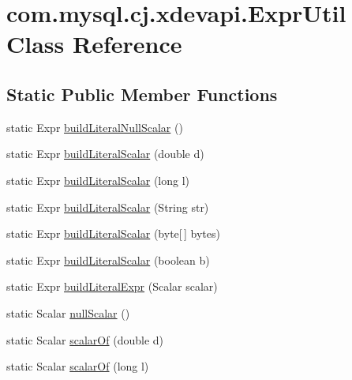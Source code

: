 \hypertarget{classcom_1_1mysql_1_1cj_1_1xdevapi_1_1_expr_util}{}\section{com.\+mysql.\+cj.\+xdevapi.\+Expr\+Util Class Reference}
\label{classcom_1_1mysql_1_1cj_1_1xdevapi_1_1_expr_util}
\subsection*{Static Public Member Functions}
\begin{DoxyCompactItemize}
\item 
static Expr \mbox{\hyperlink{classcom_1_1mysql_1_1cj_1_1xdevapi_1_1_expr_util_ac5c53b4aaa810519b4ccfccedbf4d951}{build\+Literal\+Null\+Scalar}} ()
\item 
static Expr \mbox{\hyperlink{classcom_1_1mysql_1_1cj_1_1xdevapi_1_1_expr_util_a9012d3fccfc27722989eaf4e2b0fe0e4}{build\+Literal\+Scalar}} (double d)
\item 
static Expr \mbox{\hyperlink{classcom_1_1mysql_1_1cj_1_1xdevapi_1_1_expr_util_a797efd3e01c40c0ea772edd2032ce024}{build\+Literal\+Scalar}} (long l)
\item 
static Expr \mbox{\hyperlink{classcom_1_1mysql_1_1cj_1_1xdevapi_1_1_expr_util_a7a1bbcacdc534348ba9d712d6b9a7bbf}{build\+Literal\+Scalar}} (String str)
\item 
static Expr \mbox{\hyperlink{classcom_1_1mysql_1_1cj_1_1xdevapi_1_1_expr_util_ad94de8c51a601e7c4415e2cc651b7187}{build\+Literal\+Scalar}} (byte\mbox{[}$\,$\mbox{]} bytes)
\item 
static Expr \mbox{\hyperlink{classcom_1_1mysql_1_1cj_1_1xdevapi_1_1_expr_util_a7dd1d131c79981f74e4f33b41e4df40f}{build\+Literal\+Scalar}} (boolean b)
\item 
static Expr \mbox{\hyperlink{classcom_1_1mysql_1_1cj_1_1xdevapi_1_1_expr_util_a2afeea823683209f07637ea40323715b}{build\+Literal\+Expr}} (Scalar scalar)
\item 
static Scalar \mbox{\hyperlink{classcom_1_1mysql_1_1cj_1_1xdevapi_1_1_expr_util_a3fc7a40cc6955a58fc65f830f7c25631}{null\+Scalar}} ()
\item 
static Scalar \mbox{\hyperlink{classcom_1_1mysql_1_1cj_1_1xdevapi_1_1_expr_util_a0a7d21dcfcb1aa6814466afea74ecd5b}{scalar\+Of}} (double d)
\item 
static Scalar \mbox{\hyperlink{classcom_1_1mysql_1_1cj_1_1xdevapi_1_1_expr_util_a224d0bdfc11fd3271126c9a0d4a94e49}{scalar\+Of}} (long l)

\end{DoxyCompactItemize}
